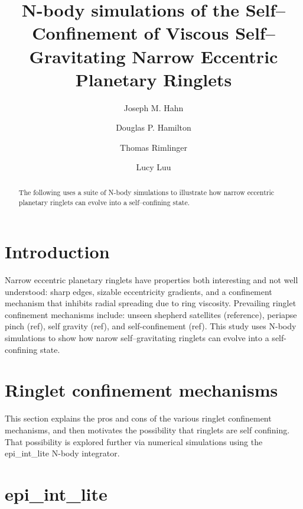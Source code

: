 \documentclass[preprint]{aastex62}
\begin{document}
\title{N-body simulations of the Self--Confinement of 
Viscous Self--Gravitating Narrow Eccentric Planetary Ringlets}


\author{Joseph M. Hahn}

\author{Douglas P. Hamilton}

\author{Thomas Rimlinger}

\author{Lucy Luu}


\begin{abstract}

The following uses a suite of N-body simulations
to illustrate how narrow eccentric planetary ringlets can evolve into a 
self--confining state.

\end{abstract}




\section{Introduction}
\label{sec:intro}

Narrow eccentric planetary ringlets have properties both interesting and
not well understood: sharp edges,
sizable eccentricity gradients, and a confinement mechanism that
inhibits radial spreading due to ring viscosity.
Prevailing ringlet confinement mechanisms include: 
unseen shepherd satellites (reference), periapse pinch (ref), self gravity (ref), and
self-confinement (ref). This study uses N-body simulations to show how narow
self--gravitating ringlets can evolve into a self-confining state.

\section{Ringlet confinement mechanisms}
\label{sec:confinement}

This section explains the pros and cons of the various ringlet confinement mechanisms,
and then motivates the possibility that ringlets are self confining. That possibility
is explored further via numerical simulations using the epi\_int\_lite N-body integrator.

\section{epi\_int\_lite}
\label{sec:epi_int_lite}
\end{document}
